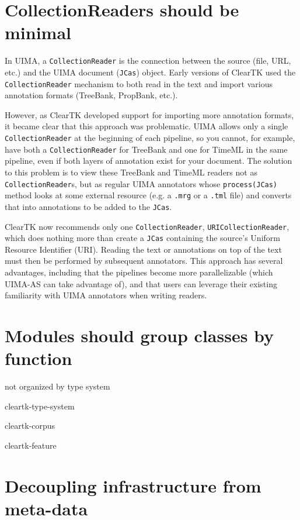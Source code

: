 \documentclass[10pt, a4paper]{article}
\newcommand{\code}[1]{\texttt{\small #1}}
\begin{document}
\section{CollectionReaders should be minimal}
In UIMA, a \code{CollectionReader} is the connection between the source (file, URL, etc.) and the UIMA document (\code{JCas}) object.
Early versions of ClearTK used the \code{CollectionReader} mechanism to both read in the text and import various annotation formats (TreeBank, PropBank, etc.).

However, as ClearTK developed support for importing more annotation formats, it became clear that this approach was problematic.
UIMA allows only a single \code{CollectionReader} at the beginning of each pipeline, so you cannot, for example, have both a \code{CollectionReader} for TreeBank and one for TimeML in the same pipeline, even if both layers of annotation exist for your document.
The solution to this problem is to view these TreeBank and TimeML readers not as \code{CollectionReader}s, but as regular UIMA annotators whose \code{process(JCas)} method looks at some external resource (e.g. a \code{.mrg} or a \code{.tml} file) and converts that into annotations to be added to the \code{JCas}.

ClearTK now recommends only one \code{CollectionReader}, \code{URICollectionReader}, which does nothing more than create a \code{JCas} containing the source's Uniform Resource Identifier (URI).
Reading the text or annotations on top of the text must then be performed by subsequent annotators.
This approach has several advantages, including that the pipelines become more parallelizable (which UIMA-AS can take advantage of), and that users can leverage their existing familiarity with UIMA annotators when writing readers.

\section{Modules should group classes by function}
not organized by type system

cleartk-type-system

cleartk-corpus

cleartk-feature


\section{Decoupling infrastructure from meta-data}
\end{document}
